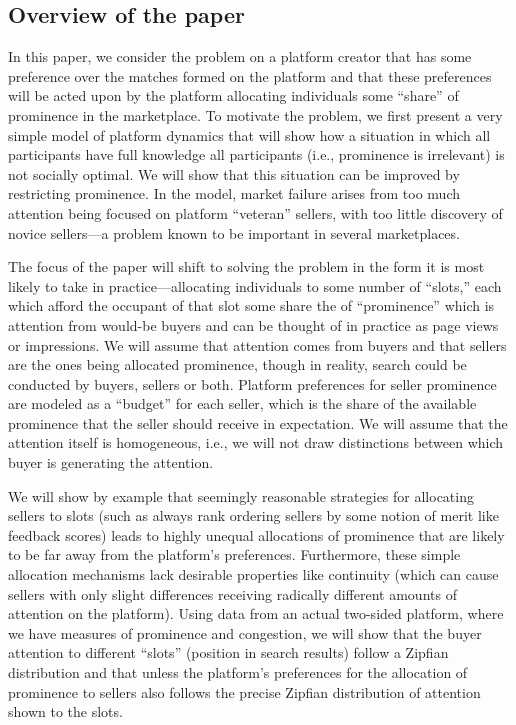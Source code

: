 \subsection{Overview of the paper} 
In this paper, we consider the problem on a platform creator that has
some preference over the matches formed on the platform and that these
preferences will be acted upon by the platform allocating individuals
some ``share'' of prominence in the marketplace. To motivate the
problem, we first present a very simple model of platform dynamics
that will show how a situation in which all participants have full
knowledge all participants (i.e., prominence is irrelevant) is not
socially optimal. We will show that this situation can be improved by
restricting prominence. In the model, market failure arises from too
much attention being focused on platform ``veteran'' sellers, with too
little discovery of novice sellers---a problem known to be important
in several marketplaces.

The focus of the paper will shift to solving the problem in the form
it is most likely to take in practice---allocating individuals to some
number of ``slots,'' each which afford the occupant of that slot some
share the of ``prominence'' which is attention from would-be buyers
and can be thought of in practice as page views or impressions. We
will assume that attention comes from buyers and that sellers are the
ones being allocated prominence, though in reality, search could be
conducted by buyers, sellers or both. Platform preferences for seller
prominence are modeled as a ``budget'' for each seller, which is the
share of the available prominence that the seller should receive in
expectation. We will assume that the attention itself is homogeneous,
i.e., we will not draw distinctions between which buyer is generating
the attention.

We will show by example that seemingly reasonable strategies for
allocating sellers to slots (such as always rank ordering sellers by
some notion of merit like feedback scores) leads to highly unequal
allocations of prominence that are likely to be far away from the
platform's preferences. Furthermore, these simple allocation
mechanisms lack desirable properties like continuity (which can cause
sellers with only slight differences receiving radically different
amounts of attention on the platform). Using data from an actual
two-sided platform, where we have measures of prominence and
congestion, we will show that the buyer attention to different
``slots'' (position in search results) follow a Zipfian distribution
and that unless the platform's preferences for the allocation of
prominence to sellers also follows the precise Zipfian distribution of
attention shown to the slots.

